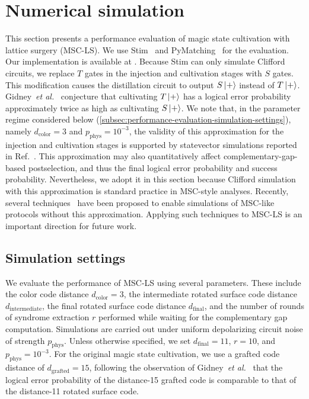 \section{Numerical simulation}
\label{sec:performance-evaluation}

This section presents a performance evaluation of magic state cultivation with lattice surgery (MSC-LS).
We use Stim~\cite{gidney2021stim} and PyMatching~\cite{higgott2025sparse} for the evaluation.
Our implementation is available at .
Because Stim can only simulate Clifford circuits, we replace $T$ gates in the injection and cultivation stages with $S$ gates.
This modification causes the distillation circuit to output $S\ket{+}$ instead of $T\ket{+}$.
Gidney~\textit{et al.}~\cite{Gidney2024MagicStateCultivation} conjecture that cultivating $T\ket{+}$ has a logical error probability approximately twice as high as cultivating $S\ket{+}$.
We note that, in the parameter regime considered below (\autoref{subsec:performance-evaluation-simulation-settings}), namely $d_\mathrm{color} = 3$ and $p_\mathrm{phys} = 10^{-3}$, the validity of this approximation for the injection and cultivation stages is supported by statevector simulations reported in Ref.~\cite{Gidney2024MagicStateCultivation}.
This approximation may also quantitatively affect complementary-gap-based postselection, and thus the final logical error probability and success probability.
Nevertheless, we adopt it in this section because Clifford simulation with this approximation is standard practice in MSC-style analyses.
Recently, several techniques~\cite{wan2025simulate, surti2025efficient, li2025soft} have been proposed to enable simulations of MSC-like protocols without this approximation.
Applying such techniques to MSC-LS is an important direction for future work.

\subsection{Simulation settings} \label{subsec:performance-evaluation-simulation-settings}
We evaluate the performance of MSC-LS using several parameters.
These include the color code distance $d_{\mathrm{color}} = 3$, the intermediate rotated surface code distance $d_\mathrm{intermediate}$, the final rotated surface code distance $d_\mathrm{final}$, and the number of rounds of syndrome extraction $r$ performed while waiting for the complementary gap computation.
Simulations are carried out under uniform depolarizing circuit noise of strength $p_\mathrm{phys}$.
Unless otherwise specified, we set $d_\mathrm{final} = 11$, $r = 10$, and $p_\mathrm{phys} = 10^{-3}$.
For the original magic state cultivation, we use a grafted code distance of $d_\mathrm{grafted} = 15$, following the observation of Gidney~\textit{et al.}~\cite{Gidney2024MagicStateCultivation} that the logical error probability of the distance-15 grafted code is comparable to that of the distance-11 rotated surface code.

